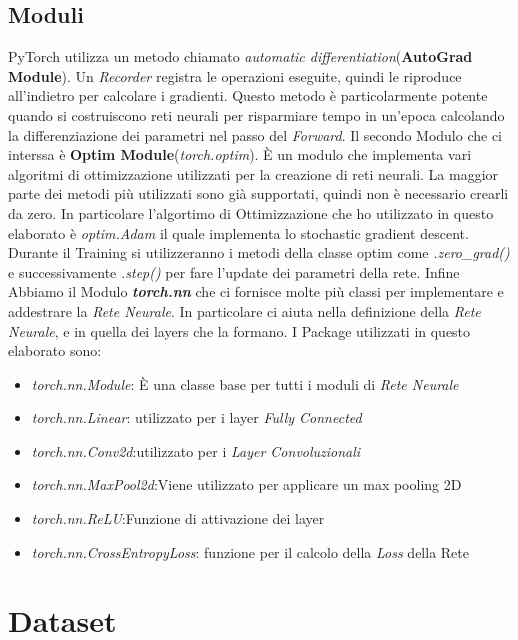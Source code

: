 \subsection{Moduli}
PyTorch utilizza un metodo chiamato \textit{automatic differentiation}(\textbf{AutoGrad Module}). Un \textit{Recorder} registra le operazioni eseguite, quindi le riproduce all'indietro per calcolare i gradienti. Questo metodo è particolarmente potente quando si costruiscono reti neurali per risparmiare tempo in un'epoca calcolando la differenziazione dei parametri nel passo del \textit{Forward}.
\newline
Il secondo Modulo che ci interssa è \textbf{Optim Module}(\textit{torch.optim}).
È un modulo che implementa vari algoritmi di ottimizzazione utilizzati per la creazione di reti neurali. La maggior parte dei metodi più utilizzati sono già supportati, quindi non è necessario crearli da zero. In particolare l'algortimo di Ottimizzazione che ho utilizzato in questo elaborato è \textit{optim.Adam} il quale implementa lo stochastic gradient descent.
Durante il Training si utilizzeranno i metodi della classe optim come \textit{ .zero\_grad()} e successivamente \textit{.step()} per fare l'update dei parametri della rete.
\newline
Infine Abbiamo il Modulo \textbf{\textit{torch.nn}} che ci fornisce molte più classi  per implementare e addestrare la \textit{Rete Neurale}. In particolare ci aiuta nella definizione della \textit{Rete Neurale}, e in quella dei layers che la formano.
\newpage
I Package utilizzati in questo elaborato sono:
\begin{itemize}
    \item \textit{torch.nn.Module}: È una classe base per tutti i moduli di \textit{Rete Neurale}
    \item \textit{torch.nn.Linear}: utilizzato per i layer \textit{Fully Connected}
    \item \textit{torch.nn.Conv2d}:utilizzato per i \textit{Layer Convoluzionali}
    \item \textit{torch.nn.MaxPool2d}:Viene utilizzato per applicare un max pooling 2D 
    \item \textit{torch.nn.ReLU}:Funzione di attivazione dei layer
    \item \textit{torch.nn.CrossEntropyLoss}: funzione per il calcolo della \textit{Loss} della Rete
\end{itemize}
\section{Dataset} 
